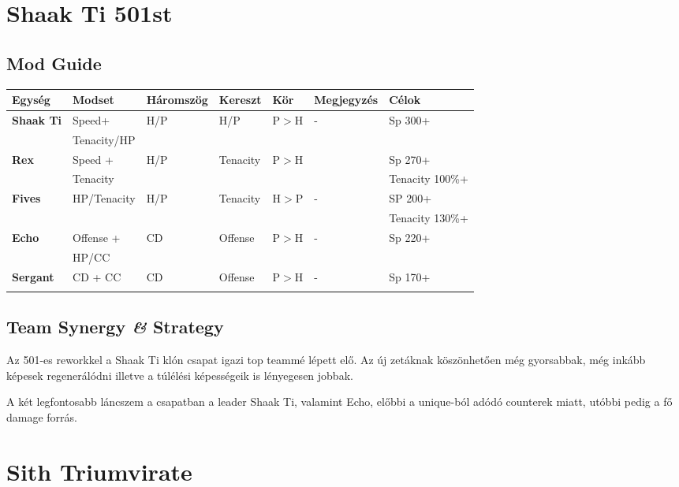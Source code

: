 \documentclass[11pt]{report}
\begin{document}
\chapter{Shaak Ti 501st}
\section{Mod Guide}
\begin{center}
    \begin{tabular}{|l | l | l | l | l | l | l |}
        \hline
        Egység & Modset & Háromszög & Kereszt & Kör & Megjegyzés & Célok\\ \hline
        \textbf{Shaak Ti} & Speed+ & H/P & H/P & P$>$H & - & Sp 300+\\
        & Tenacity/HP &  &  &  &  & \\ \hline
        \textbf{Rex} & Speed + & H/P & Tenacity & P$>$H &  & Sp 270+\\
        & Tenacity &  &  &  &  & Tenacity 100\%+\\ \hline
        \textbf{Fives} & HP/Tenacity & H/P & Tenacity & H$>$P & - & SP 200+\\
        &  &  &  &  &  & Tenacity 130\%+\\ \hline
        \textbf{Echo} & Offense + & CD & Offense & P$>$H & - & Sp 220+\\
        & HP/CC &  &  &  &  & \\ \hline
        \textbf{Sergant} & CD + CC & CD & Offense & P$>$H & - & Sp 170+\\
        &  &  &  &  &  & \\ \hline
    \end{tabular}
\end{center}
\section{Team Synergy \textit{\&} Strategy}
Az 501-es reworkkel a Shaak Ti klón csapat igazi top teammé lépett elő. Az új zetáknak köszönhetően még gyorsabbak, még inkább képesek regenerálódni illetve a túlélési képességeik is lényegesen jobbak.\par
A két legfontosabb láncszem a csapatban a leader Shaak Ti, valamint Echo, előbbi a unique-ból adódó counterek miatt, utóbbi pedig a fő damage forrás.


\chapter{Sith Triumvirate}
\end{document}
